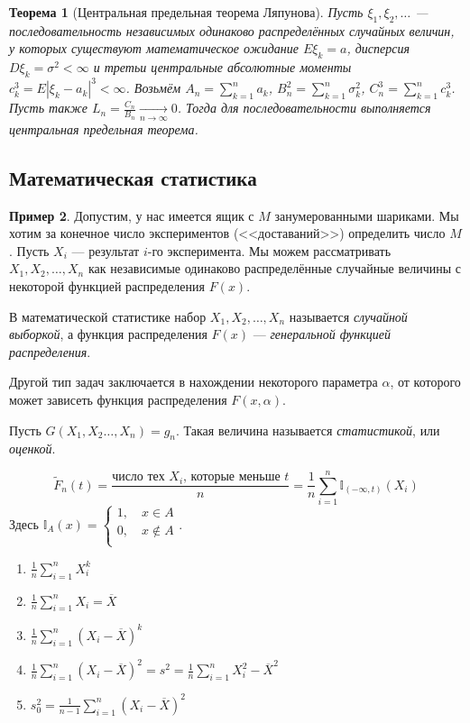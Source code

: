 \documentclass[11pt,openany,a4paper]{scrartcl}
\theoremstyle{plain}
\newtheorem{theorem}{Теорема}[subsection]
\theoremstyle{definition}
\newtheorem{example}[theorem]{Пример}
\newcommand{\underto}[1]{\xrightarrow[#1]{}}
\newcommand{\ol}{\overline}
\begin{document}
\begin{theorem}[Центральная предельная теорема Ляпунова]
    Пусть $\xi_1, \xi_2, \ldots$ — последовательность независимых одинаково распределённых 
    случайных величин, у которых существуют математическое ожидание $E\xi_k = a$, 
    дисперсия $D\xi_k = \sigma^2 < \infty$ и третьи центральные абсолютные моменты
    $c_k^3 = E|\xi_k - a_k|^3 < \infty$. Возьмём $A_n = \sum\limits_{k=1}^n a_k$,
    $B_n^2 = \sum\limits_{k=1}^n \sigma_k^2$, $C_n^3 = \sum\limits_{k=1}^n c_k^3$.
    Пусть также $L_n = \frac{C_n}{B_n} \underto{n \to \infty} 0$. Тогда для
    последовательности выполняется центральная предельная теорема.
\end{theorem}

\subsection{Математическая статистика}

\begin{example}
    Допустим, у нас имеется ящик с $M$ занумерованными шариками. Мы хотим за конечное число
    экспериментов (<<доставаний>>) определить число $M$. Пусть $X_i$ — результат
    $i$-го эксперимента. Мы можем рассматривать $X_1, X_2, \ldots, X_n$ как независимые 
    одинаково распределённые случайные величины с некоторой функцией распределения $F(x)$.
\end{example}

В математической статистике набор $X_1, X_2, \ldots, X_n$ называется
\emph{случайной выборкой}, а функция распределения $F(x)$ —
\emph{генеральной функцией распределения}.

Другой тип задач заключается в нахождении некоторого параметра $\alpha$, от которого
может зависеть функция распределения $F(x, \alpha)$.

Пусть $G(X_1, X_2 \ldots, X_n) = g_n$. Такая величина называется \emph{статистикой}, или 
\emph{оценкой}.

$$
\widetilde{F}_n(t) = \frac{\text{число тех } X_i \text{, которые меньше } t}{n} =
\frac{1}{n}\sum\limits_{i=1}^n\mathbb I_{(-\infty, t)}(X_i)
$$
Здесь $\mathbb I_A(x) = \begin{cases}
    1,\quad x \in A \\
    0,\quad x \notin A \\
\end{cases}$.

\begin{enumerate}
    \item $\frac{1}{n}\sum\limits_{i=1}^n X_i^k$
    \item $\frac{1}{n}\sum\limits_{i=1}^nX_i = \ol X$
    \item $\frac{1}{n}\sum\limits_{i=1}^n(X_i - \ol X)^k$
    \item $\frac{1}{n}\sum\limits_{i=1}^n(X_i - \ol X)^2 = s^2 =
    \frac{1}{n}\sum\limits_{i=1}^n X_i^2 - {\ol X}^2$
    \item $s_0^2 = \frac{1}{n-1}\sum\limits_{i=1}^n(X_i - \ol X)^2$
\end{enumerate}
\end{document}
